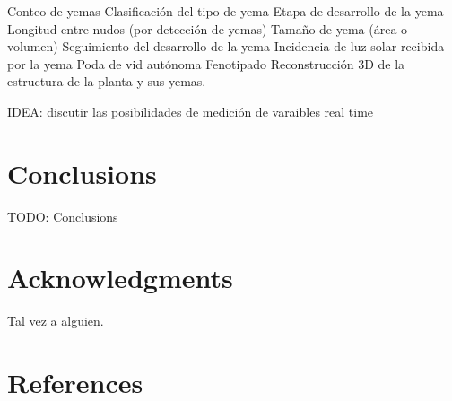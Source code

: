 \documentclass[a4paper,authoryear,review]{elsarticle}
\begin{document}
Conteo de yemas
Clasificación del tipo de yema
Etapa de desarrollo de la yema
Longitud entre nudos (por detección de yemas)
Tamaño de yema (área o volumen)
Seguimiento del desarrollo de la yema
Incidencia de luz solar recibida por la yema
Poda de vid autónoma
Fenotipado
Reconstrucción 3D de la estructura de la planta y sus yemas.

IDEA: discutir las posibilidades de medición de varaibles real time


\section{Conclusions}

TODO: Conclusions

\section*{Acknowledgments}

Tal vez a alguien.

\section*{References}

\end{document}

